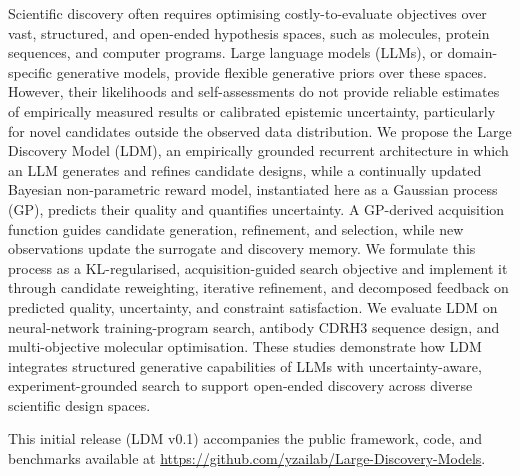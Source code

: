 Scientific discovery often requires optimising costly-to-evaluate objectives over vast, structured, and open-ended hypothesis spaces, such as molecules, protein sequences, and computer programs. Large language models (LLMs), or domain-specific generative models, provide flexible generative priors over these spaces. However, their likelihoods and self-assessments do not provide reliable estimates of empirically measured results or calibrated epistemic uncertainty, particularly for novel candidates outside the observed data distribution. We propose the Large Discovery Model (LDM), an empirically grounded recurrent architecture in which an LLM generates and refines candidate designs, while a continually updated Bayesian non-parametric reward model, instantiated here as a Gaussian process (GP), predicts their quality and quantifies uncertainty. A GP-derived acquisition function guides candidate generation, refinement, and selection, while new observations update the surrogate and discovery memory. We formulate this process as a KL-regularised, acquisition-guided search objective and implement it through candidate reweighting, iterative refinement, and decomposed feedback on predicted quality, uncertainty, and constraint satisfaction. We evaluate LDM on neural-network training-program search, antibody CDRH3 sequence design, and multi-objective molecular optimisation. These studies demonstrate how LDM integrates structured generative capabilities of LLMs with uncertainty-aware, experiment-grounded search to support open-ended discovery across diverse scientific design spaces.


This initial release (LDM v0.1) accompanies the public framework, code, and benchmarks available at \url{https://github.com/yzailab/Large-Discovery-Models}. 

